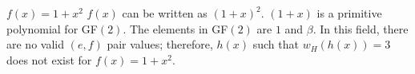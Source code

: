  \begin{example}
 $f(x)=1+x^2$ \newline $f(x)$ can be written as $(1+x)^2$. $(1+x)$ is a primitive polynomial for GF$(2)$. The elements in GF$(2)$ are $1$ and $\beta$. In this field,  there are no valid $(e,f)$ pair values; therefore, $h(x)$ such that  $w_H(h(x))=3$ does not exist for $f(x)=1+x^2$.
\label{ex-6}
 \end{example}
 
 
 


